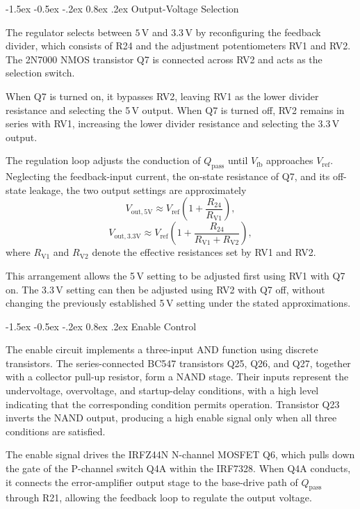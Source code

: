 \documentclass[conference]{IEEEtran}
\makeatletter
\renewcommand\subsection{\@startsection{subsection}{2}{\z@}%
  {-1.5ex \@plus -0.5ex \@minus -.2ex}%
  {0.8ex \@plus .2ex}%
  {\normalfont\sffamily\normalsize\bfseries}}
\makeatother
\begin{document}
\subsection{Output-Voltage Selection}

The regulator selects between \(5\,\mathrm{V}\) and
\(3.3\,\mathrm{V}\) by reconfiguring the feedback divider,
which consists of R24 and the adjustment potentiometers
RV1 and RV2. The 2N7000 NMOS transistor Q7 is connected
across RV2 and acts as the selection switch.

When Q7 is turned on, it bypasses RV2, leaving RV1
as the lower divider resistance and selecting the
5\,V output. When Q7 is turned off, RV2 remains in
series with RV1, increasing the lower divider
resistance and selecting the 3.3\,V output.

The regulation loop adjusts the conduction of
\(Q_{\mathrm{pass}}\) until \(V_{\mathrm{fb}}\)
approaches \(V_{\mathrm{ref}}\). Neglecting the
feedback-input current, the on-state resistance
of Q7, and its off-state leakage, the two output
settings are approximately
\[
V_{\mathrm{out,5V}}
\approx
V_{\mathrm{ref}}
\left(
1+\frac{R_{24}}{R_{\mathrm{V1}}}
\right),
\]
\[
V_{\mathrm{out,3.3V}}
\approx
V_{\mathrm{ref}}
\left(
1+\frac{R_{24}}{R_{\mathrm{V1}}+R_{\mathrm{V2}}}
\right),
\]
where \(R_{\mathrm{V1}}\) and \(R_{\mathrm{V2}}\)
denote the effective resistances set by RV1 and RV2.

This arrangement allows the 5\,V setting to be
adjusted first using RV1 with Q7 on. The 3.3\,V
setting can then be adjusted using RV2 with Q7 off,
without changing the previously established
5\,V setting under the stated approximations.

\subsection{Enable Control}

The enable circuit implements a three-input AND function
using discrete transistors. The series-connected BC547
transistors Q25, Q26, and Q27, together with a collector
pull-up resistor, form a NAND stage. Their inputs represent
the undervoltage, overvoltage, and startup-delay conditions,
with a high level indicating that the corresponding
condition permits operation. Transistor Q23 inverts the
NAND output, producing a high enable signal only when
all three conditions are satisfied.

The enable signal drives the IRFZ44N N-channel MOSFET
Q6, which pulls down the gate of the P-channel switch
Q4A within the IRF7328. When Q4A conducts, it connects
the error-amplifier output stage to the base-drive
path of \(Q_{\mathrm{pass}}\) through R21, allowing
the feedback loop to regulate the output voltage.
\end{document}
